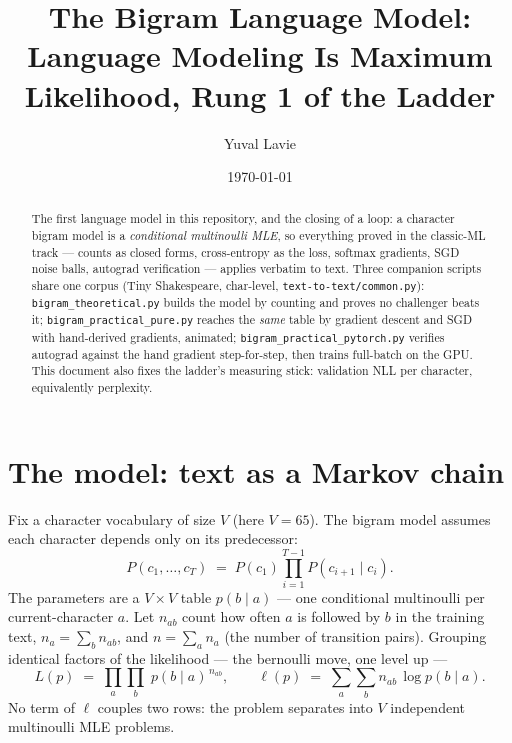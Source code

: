 \documentclass[11pt]{article}
\title{The Bigram Language Model:\\
Language Modeling Is Maximum Likelihood, Rung 1 of the Ladder}
\author{Yuval Lavie}
\date{\today}
\begin{document}
\maketitle

\begin{abstract}
The first language model in this repository, and the closing of a loop:
a character bigram model is a \emph{conditional multinoulli MLE}, so
everything proved in the classic-ML track --- counts as closed forms,
cross-entropy as the loss, softmax gradients, SGD noise balls, autograd
verification --- applies verbatim to text. Three companion scripts share
one corpus (Tiny Shakespeare, char-level, \texttt{text-to-text/common.py}):
\texttt{bigram\_theoretical.py} builds the model by counting and proves
no challenger beats it; \texttt{bigram\_practical\_pure.py} reaches the
\emph{same} table by gradient descent and SGD with hand-derived
gradients, animated; \texttt{bigram\_practical\_pytorch.py} verifies
autograd against the hand gradient step-for-step, then trains
full-batch on the GPU. This document also fixes the ladder's measuring
stick: validation NLL per character, equivalently perplexity.
\end{abstract}

\section{The model: text as a Markov chain}

Fix a character vocabulary of size $V$ (here $V = 65$). The bigram
model assumes each character depends only on its predecessor:
\begin{equation}
  P(c_1, \dots, c_T)
  \;=\; P(c_1) \prod_{i=1}^{T-1} P(c_{i+1} \mid c_i).
  \label{eq:markov}
\end{equation}
The parameters are a $V \times V$ table $p(b \mid a)$ --- one
conditional multinoulli per current-character $a$. Let
$n_{ab}$ count how often $a$ is followed by $b$ in the training text,
$n_a = \sum_b n_{ab}$, and $n = \sum_a n_a$ (the number of transition
pairs). Grouping identical factors of the likelihood --- the bernoulli
move, one level up ---
\begin{equation}
  L(p) \;=\; \prod_{a}\prod_{b}\; p(b \mid a)^{\,n_{ab}},
  \qquad
  \ell(p) \;=\; \sum_{a}\sum_{b} n_{ab}\,\log p(b \mid a).
  \label{eq:loglik}
\end{equation}
No term of $\ell$ couples two rows: the problem separates into $V$
independent multinoulli MLE problems.
\end{document}
